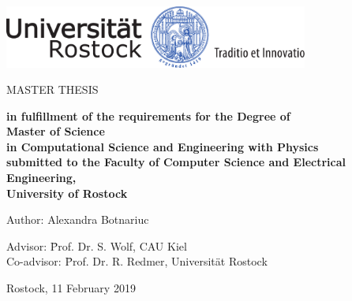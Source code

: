 \thispagestyle{empty}
\begin{center}
\vspace*{-2cm}
\includegraphics[width=0.75\textwidth]{img/unilogo-color}\\
\vspace*{3cm}
    {\titlefont \huge \onehalfspacing
	\thetitle 
    \par}
   \vfill
	\Large{\uppercase{Master Thesis}} 

\end{center}\par

\vspace{1cm}

\begin{center}
\textbf{
	in fulfillment of the requirements for the Degree of \\
	\vspace{5mm}
	{\Large Master of Science} \\
	\vspace{5mm}
	in Computational Science and Engineering with Physics \\
	submitted to the Faculty of Computer Science and Electrical Engineering, \\
	University of Rostock}
\end{center}
\vspace*{1cm}
\noindent\begin{minipage}[b]{\textwidth}
{
\null\hfill Author: Alexandra Botnariuc \\
\vspace*{1.5cm}

	\begin{tabbing}
	Advisor:  \= Prof. Dr. S. Wolf, CAU Kiel\\
	Co-advisor: \=  Prof. Dr. R. Redmer, Universität Rostock \\
	\end{tabbing}

  \noindent Rostock, 11 February 2019
  \par
  }
\end{minipage}


